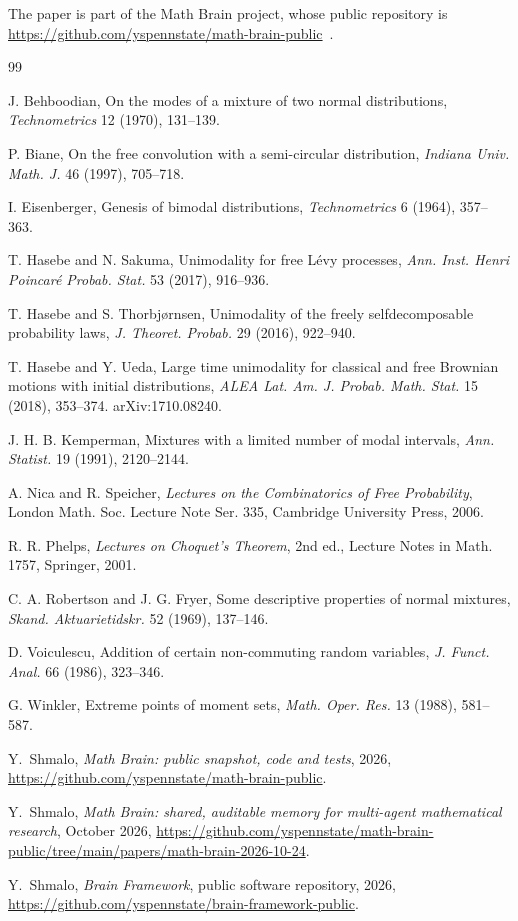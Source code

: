 \documentclass[11pt]{amsart}
\theoremstyle{definition}
\begin{document}
The paper is part of the Math Brain project, whose public repository is \url{https://github.com/yspennstate/math-brain-public}~\cite{MathBrainRepo}.

\begin{thebibliography}{99}

 J. Behboodian, On the modes of a mixture of two normal distributions, \emph{Technometrics} 12 (1970), 131--139.

 P. Biane, On the free convolution with a semi-circular distribution, \emph{Indiana Univ. Math. J.} 46 (1997), 705--718.

 I. Eisenberger, Genesis of bimodal distributions, \emph{Technometrics} 6 (1964), 357--363.

 T. Hasebe and N. Sakuma, Unimodality for free L\'evy processes, \emph{Ann. Inst. Henri Poincar\'e Probab. Stat.} 53 (2017), 916--936.

 T. Hasebe and S. Thorbj\o rnsen, Unimodality of the freely selfdecomposable probability laws, \emph{J. Theoret. Probab.} 29 (2016), 922--940.

 T. Hasebe and Y. Ueda, Large time unimodality for classical and free Brownian motions with initial distributions, \emph{ALEA Lat. Am. J. Probab. Math. Stat.} 15 (2018), 353--374. arXiv:1710.08240.

 J. H. B. Kemperman, Mixtures with a limited number of modal intervals, \emph{Ann. Statist.} 19 (1991), 2120--2144.

 A. Nica and R. Speicher, \emph{Lectures on the Combinatorics of Free Probability}, London Math. Soc. Lecture Note Ser. 335, Cambridge University Press, 2006.

 R. R. Phelps, \emph{Lectures on Choquet's Theorem}, 2nd ed., Lecture Notes in Math. 1757, Springer, 2001.

 C. A. Robertson and J. G. Fryer, Some descriptive properties of normal mixtures, \emph{Skand. Aktuarietidskr.} 52 (1969), 137--146.

 D. Voiculescu, Addition of certain non-commuting random variables, \emph{J. Funct. Anal.} 66 (1986), 323--346.

 G. Winkler, Extreme points of moment sets, \emph{Math. Oper. Res.} 13 (1988), 581--587.

 Y.~Shmalo, \emph{Math Brain: public snapshot, code and tests}, 2026, \url{https://github.com/yspennstate/math-brain-public}.

 Y.~Shmalo, \emph{Math Brain: shared, auditable memory for multi-agent mathematical research}, October 2026, \url{https://github.com/yspennstate/math-brain-public/tree/main/papers/math-brain-2026-10-24}.

 Y.~Shmalo, \emph{Brain Framework}, public software repository, 2026, \url{https://github.com/yspennstate/brain-framework-public}.

\end{thebibliography}
\end{document}
